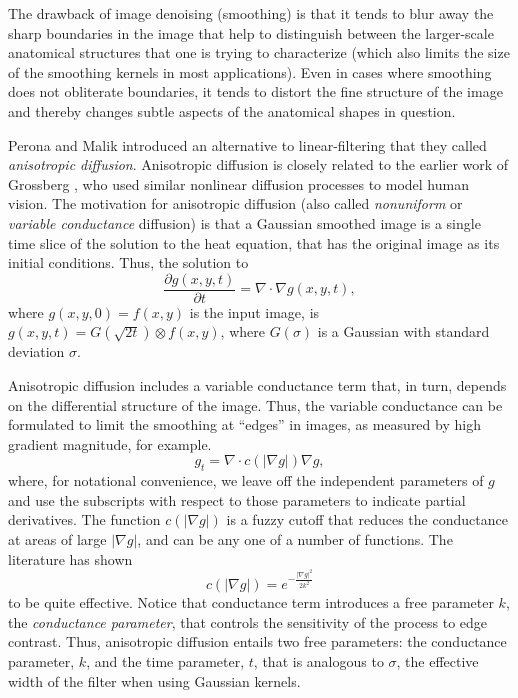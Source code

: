 %
%
%
%

The drawback of image denoising (smoothing) is that it tends to blur away the
sharp boundaries in the image that help to distinguish between the
larger-scale anatomical structures that one is trying to characterize (which
also limits the size of the smoothing kernels in most applications).  Even in
cases where smoothing does not obliterate boundaries, it tends to distort the
fine structure of the image and thereby changes subtle aspects of the
anatomical shapes in question.

Perona and Malik \cite{Perona1990} introduced an alternative to
linear-filtering that they called \emph{anisotropic diffusion}.  Anisotropic
diffusion is closely related to the earlier work of Grossberg
\cite{Grossberg1984}, who used similar nonlinear diffusion processes to model
human vision.  The motivation for anisotropic diffusion (also called
\emph{nonuniform} or \emph{variable conductance} diffusion) is that a Gaussian
smoothed image is a single time slice of the solution to the heat equation,
that has the original image as its initial conditions.  Thus, the solution to
\begin{equation} \frac{\partial g(x, y, t) }{\partial t} = \nabla \cdot \nabla
g(x, y, t), \end{equation} where $g(x, y, 0) = f(x, y)$ is the input image, is
$g(x, y, t) = G(\sqrt{2t}) \otimes f(x, y)$, where $G(\sigma)$ is a Gaussian
with standard deviation $\sigma$.

Anisotropic diffusion includes a variable conductance term that, in turn,
depends on the differential structure of the image.  Thus, the variable
conductance can be formulated to limit the smoothing at ``edges'' in images, as
measured by high gradient magnitude, for example. \begin{equation} g_{t} = \nabla \cdot
c(\left| \nabla g \right|) \nabla g, \label{eq:aniso} \end{equation} where, for
notational convenience, we leave off the independent parameters of $g$ and use
the subscripts with respect to those parameters to indicate partial
derivatives.  The function $c(|\nabla g|)$ is a fuzzy cutoff that reduces the
conductance at areas of large $|\nabla g|$, and can be any one of a number of
functions.  The literature has shown \begin{equation} c(|\nabla g|) =
e^{-\frac{|\nabla g|^{2}}{2k^{2}}} \end{equation} to be quite effective.
Notice that conductance term introduces a free parameter $k$, the {\em
conductance parameter}, that controls the sensitivity of the process to edge
contrast.  Thus, anisotropic diffusion entails two free parameters: the
conductance parameter, $k$, and the time parameter, $t$, that is analogous to
$\sigma$, the effective width of the filter when using Gaussian kernels.

